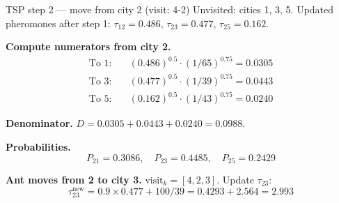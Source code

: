 \documentclass[a4paper,11pt]{article}
\begin{document}
\begin{worked}{TSP step 2 --- move from city 2 (visit: 4-2)}
Unvisited: cities 1, 3, 5.
Updated pheromones after step 1:
$\tau_{12} = 0.486$, $\tau_{23} = 0.477$, $\tau_{25} = 0.162$.

\begin{steps}
  \item \textbf{Compute numerators from city 2.}
        \begin{align*}
          \text{To 1:} & \quad (0.486)^{0.5} \cdot (1/65)^{0.75} = 0.0305 \\
          \text{To 3:} & \quad (0.477)^{0.5} \cdot (1/39)^{0.75} = 0.0443 \\
          \text{To 5:} & \quad (0.162)^{0.5} \cdot (1/43)^{0.75} = 0.0240
        \end{align*}

  \item \textbf{Denominator.} $D = 0.0305 + 0.0443 + 0.0240 = 0.0988$.

  \item \textbf{Probabilities.}
        \[
          P_{21} = 0.3086, \quad
          P_{23} = \mathbf{0.4485}, \quad
          P_{25} = 0.2429
        \]

  \item \textbf{Ant moves from 2 to city 3.}
        $\text{visit}_k = [4, 2, 3]$.
        Update $\tau_{23}$:
        \[
          \tau_{23}^{\text{new}}
            = 0.9 \times 0.477 + 100/39 = 0.4293 + 2.564 = \mathbf{2.993}
        \]
\end{steps}
\end{worked}
\end{document}
